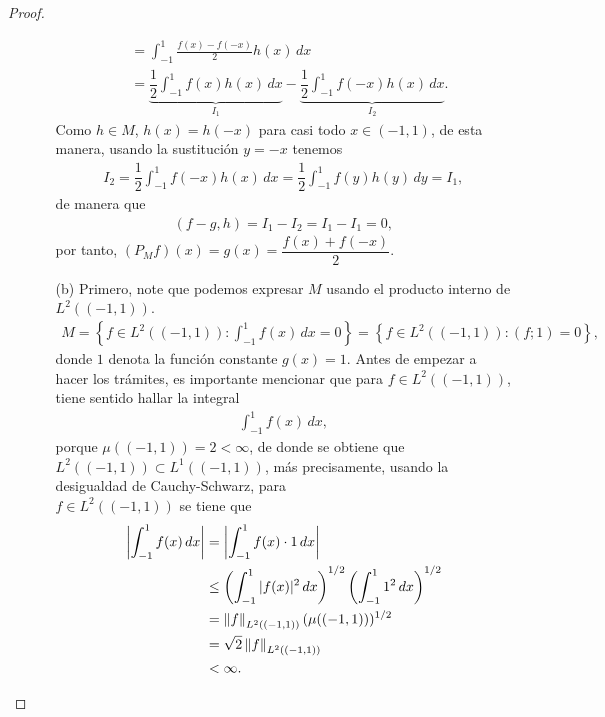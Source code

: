 \begin{proof}
\begin{enumerate}
\begin{enumerate}
\begin{align*}
            &=\int_{-1}^1\frac{f(x)-f(-x)}{2}h(x)\, dx\\
            &=\underbrace{\dfrac{1}{2}\int_{-1}^1f(x)h(x)\, dx}_{I_1}-\underbrace{\dfrac{1}{2}\int_{-1}^1 f(-x)h(x)\, dx}_{I_2}.
        \end{align*}
        Como $h\in M$, $h(x)=h(-x)$ para casi todo $x \in (-1,1)$, de esta manera, usando la sustitución $y=-x$ tenemos
        \begin{align*}
            I_2=\dfrac{1}{2}\int_{-1}^1 f(-x)h(x)\, dx=\dfrac{1}{2}\int_{-1}^1f(y)h(y)\, dy=I_1,
        \end{align*}
        de manera que 
        \begin{align*}
            (f-g,h)=I_1-I_2=I_1-I_1=0,
        \end{align*}
        por tanto, $(P_M f)(x)=g(x)=\dfrac{f(x)+f(-x)}{2}$.

        \item[(b)] Primero, note que podemos expresar $M$ usando el producto interno de $L^2((-1,1))$.
        \begin{align*}
            M=\left\{f \in L^2((-1,1)):\int_{-1}^1f(x)\, dx=0\right\}=\left\{f\in L^2((-1,1)): (f;1)=0\right\},
        \end{align*}
        donde $1$ denota la función constante $g(x)=1$. Antes de empezar a hacer los trámites, es importante mencionar que para $f \in L^2((-1,1))$, tiene sentido hallar la integral 
        \begin{align*}
            \int_{-1}^1f(x)\, dx,
        \end{align*}
        porque $\mu((-1,1))=2<\infty$, de donde se obtiene que $L^2((-1,1))\subset L^1((-1,1))$, más precisamente, usando la desigualdad de Cauchy-Schwarz, para \\
        $f \in L^2((-1,1))$ se tiene que 
        \begin{align*}
            \left|\int_{-1}^1f(x)\, dx\right|&=\left|\int_{-1}^1f(x)\cdot 1\, dx\right|\\
            &\leq \left(\int_{-1}^1|f(x)|^2\, dx\right)^{1/2}\left(\int_{-1}^1 1^2\, dx\right)^{1/2}\\
            &=\left\|f\right\|_{L^2((-1,1))}(\mu((-1,1)))^{1/2}\\
            &=\sqrt{2}\left\|f\right\|_{L^2((-1,1))}\\
            &<\infty.
        \end{align*}
        

\end{enumerate}
\end{enumerate}
\end{proof}
